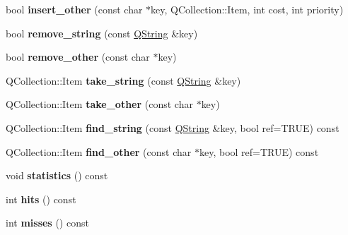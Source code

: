 \begin{DoxyCompactItemize}
\item 
\hypertarget{class_q_g_cache_a728e94871d9bda66789bb192e5c2f7ec}{bool {\bfseries insert\-\_\-other} (const char $\ast$key, Q\-Collection\-::\-Item, int cost, int priority)}\label{class_q_g_cache_a728e94871d9bda66789bb192e5c2f7ec}

\item 
\hypertarget{class_q_g_cache_a38dbf0f7470da45afc8b2a6840574ee3}{bool {\bfseries remove\-\_\-string} (const \hyperlink{class_q_string}{Q\-String} \&key)}\label{class_q_g_cache_a38dbf0f7470da45afc8b2a6840574ee3}

\item 
\hypertarget{class_q_g_cache_adae14b7cc1528af64640809559e4c9ec}{bool {\bfseries remove\-\_\-other} (const char $\ast$key)}\label{class_q_g_cache_adae14b7cc1528af64640809559e4c9ec}

\item 
\hypertarget{class_q_g_cache_afd5766efec3b442000c295d7786e4068}{Q\-Collection\-::\-Item {\bfseries take\-\_\-string} (const \hyperlink{class_q_string}{Q\-String} \&key)}\label{class_q_g_cache_afd5766efec3b442000c295d7786e4068}

\item 
\hypertarget{class_q_g_cache_a2b76550d3d146da6591dbc70de8606ba}{Q\-Collection\-::\-Item {\bfseries take\-\_\-other} (const char $\ast$key)}\label{class_q_g_cache_a2b76550d3d146da6591dbc70de8606ba}

\item 
\hypertarget{class_q_g_cache_a048fc5166d86b1d3320e41e3fa47d86a}{Q\-Collection\-::\-Item {\bfseries find\-\_\-string} (const \hyperlink{class_q_string}{Q\-String} \&key, bool ref=T\-R\-U\-E) const }\label{class_q_g_cache_a048fc5166d86b1d3320e41e3fa47d86a}

\item 
\hypertarget{class_q_g_cache_a3456797d0195829abc9b64bb2bffd17b}{Q\-Collection\-::\-Item {\bfseries find\-\_\-other} (const char $\ast$key, bool ref=T\-R\-U\-E) const }\label{class_q_g_cache_a3456797d0195829abc9b64bb2bffd17b}

\item 
\hypertarget{class_q_g_cache_a2b624ae0c69f64a3f0cb59d8ac80e365}{void {\bfseries statistics} () const }\label{class_q_g_cache_a2b624ae0c69f64a3f0cb59d8ac80e365}

\item 
\hypertarget{class_q_g_cache_ab5211b6adcb89c296fcc3b6f60b8b6c7}{int {\bfseries hits} () const }\label{class_q_g_cache_ab5211b6adcb89c296fcc3b6f60b8b6c7}

\item 
\hypertarget{class_q_g_cache_ad9a016e5d65ed3c1d57ade79ac7d4e35}{int {\bfseries misses} () const }\label{class_q_g_cache_ad9a016e5d65ed3c1d57ade79ac7d4e35}

\end{DoxyCompactItemize}
